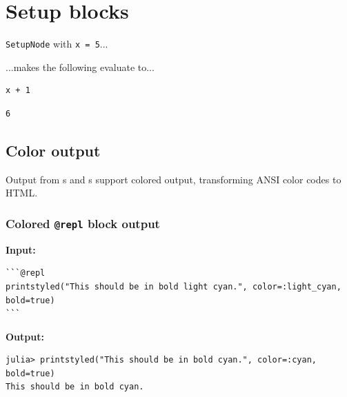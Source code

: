 \section{Setup blocks}



\label{1558249602249213174}{}


\texttt{SetupNode} with \texttt{x = 5}...





...makes the following evaluate to...




\begin{verbatim}
x + 1
\end{verbatim}


\begin{verbatim}
6
\end{verbatim}



\subsection{Color output}



\label{17795897094861326390}{}


Output from s and s support colored output,
transforming ANSI color codes to HTML.



\subsubsection{Colored \texttt{@repl} block output}



\label{2464625021025382405}{}


\textbf{Input:}




\begin{verbatim}
```@repl
printstyled("This should be in bold light cyan.", color=:light_cyan, bold=true)
```
\end{verbatim}



\textbf{Output:}




\begin{verbatim}
julia> printstyled("This should be in bold cyan.", color=:cyan, bold=true)
This should be in bold cyan.
\end{verbatim}



